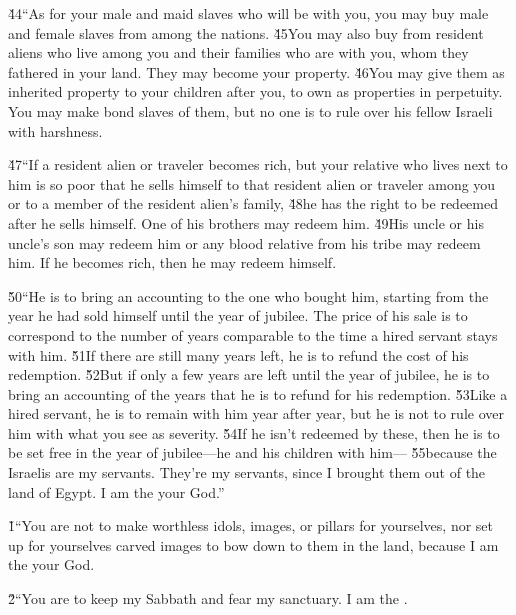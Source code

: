 \v{44}``As for your male and maid slaves who will be with you, you may buy male and female slaves from among the nations. \v{45}You may also buy from resident aliens who live among you and their families who are with you, whom they fathered in your land. They may become your property. \v{46}You may give them as inherited property to your children after you, to own as properties in perpetuity. You may make bond slaves of them, but no one is to rule over his fellow Israeli with harshness.

\v{47}``If a resident alien or traveler becomes rich, but your relative who lives next to him is so poor that he sells himself to that resident alien or traveler among you or to a member of the resident alien's family, \v{48}he has the right to be redeemed after he sells himself. One of his brothers may redeem him. \v{49}His uncle or his uncle's son may redeem him or any blood relative from his tribe may redeem him. If he becomes rich, then he may redeem himself.

\v{50}``He is to bring an accounting to the one who bought him, starting from the year he had sold himself until the year of jubilee. The price of his sale is to correspond to the number of years comparable to the time a hired servant stays with him. \v{51}If there are still many years left, he is to refund the cost of his redemption. \v{52}But if only a few years are left until the year of jubilee, he is to bring an accounting of the years that he is to refund for his redemption. \v{53}Like a hired servant, he is to remain with him year after year, but he is not to rule over him with what you see as severity. \v{54}If he isn't redeemed by these, then he is to be set free in the year of jubilee---he and his children with him--- \v{55}because the Israelis are my servants. They're my servants, since I brought them out of the land of Egypt. I am the  your God.''

\v{1}``You are not to make worthless idols, images, or pillars for yourselves, nor set up for yourselves carved images to bow down to them in the land, because I am the  your God.

\v{2}``You are to keep my Sabbath and fear my sanctuary. I am the .


